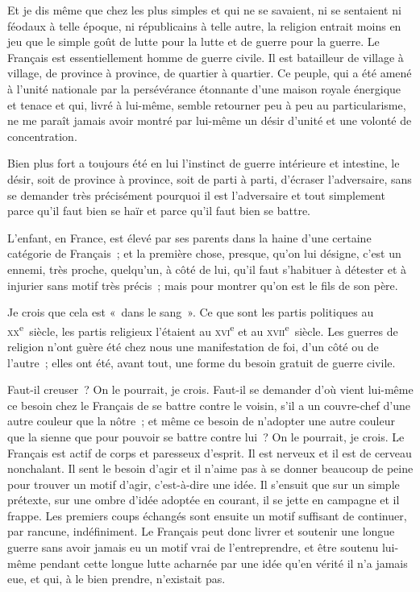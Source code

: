 \documentclass[french,twoside]{book} %
\begin{document}
Et je dis même que chez les plus simples et qui ne se savaient, ni se sentaient ni féodaux à  telle époque, ni républicains à telle autre, la religion entrait moins en jeu que le simple goût de lutte pour la lutte et de guerre pour la guerre. Le Français est essentiellement homme de guerre civile. Il est batailleur de village à village, de province à province, de quartier à quartier. Ce peuple, qui a été amené à l’unité nationale par la persévérance étonnante d’une maison royale énergique et tenace et qui, livré à lui-même, semble retourner peu à peu au particularisme, ne me paraît jamais avoir montré par lui-même un désir d’unité et une volonté de concentration.\par
Bien plus fort a toujours été en lui l’instinct de guerre intérieure et intestine, le désir, soit de province à province, soit de parti à parti, d’écraser l’adversaire, sans se demander très précisément pourquoi il est l’adversaire et tout simplement parce qu’il faut bien se haïr et parce qu’il faut bien se battre.\par
L’enfant, en France, est élevé par ses parents dans la haine d’une certaine catégorie de Français ; et la première chose, presque, qu’on lui désigne, c’est un ennemi, très proche, quelqu’un, à côté de lui, qu’il faut s’habituer à détester et à injurier sans motif très précis ; mais pour montrer qu’on est le fils de son père.\par
Je crois que cela est « dans le sang ». Ce que  sont les partis politiques au \textsc{xx}\textsuperscript{e} siècle, les partis religieux l’étaient au \textsc{xvi}\textsuperscript{e} et au \textsc{xvii}\textsuperscript{e} siècle. Les guerres de religion n’ont guère été chez nous une manifestation de foi, d’un côté ou de l’autre ; elles ont été, avant tout, une forme du besoin gratuit de guerre civile.\par
Faut-il creuser ? On le pourrait, je crois. Faut-il se demander d’où vient lui-même ce besoin chez le Français de se battre contre le voisin, s’il a un couvre-chef d’une autre couleur que la nôtre ; et même ce besoin de n’adopter une autre couleur que la sienne que pour pouvoir se battre contre lui ? On le pourrait, je crois. Le Français est actif de corps et paresseux d’esprit. Il est nerveux et il est de cerveau nonchalant. Il sent le besoin d’agir et il n’aime pas à se donner beaucoup de peine pour trouver un motif d’agir, c’est-à-dire une idée. Il s’ensuit que sur un simple prétexte, sur une ombre d’idée adoptée en courant, il se jette en campagne et il frappe. Les premiers coups échangés sont ensuite un motif suffisant de continuer, par rancune, indéfiniment. Le Français peut donc livrer et soutenir une longue guerre sans avoir jamais eu un motif vrai de l’entreprendre, et être soutenu lui-même pendant cette longue lutte acharnée par une idée qu’en vérité il n’a jamais eue, et qui, à le bien prendre, n’existait pas.\par
\end{document}
